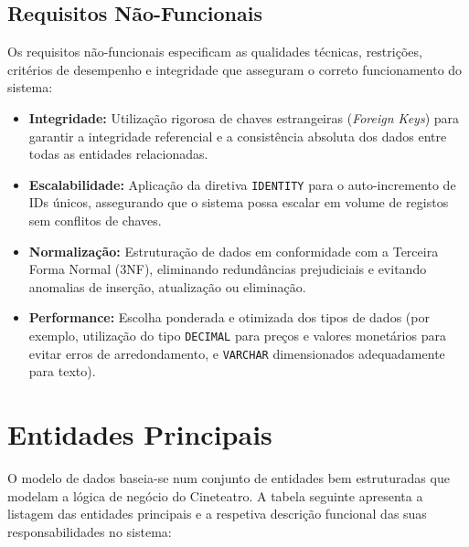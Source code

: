 \documentclass[11pt,a4paper]{article}
\begin{document}
\subsection{Requisitos Não-Funcionais}
Os requisitos não-funcionais especificam as qualidades técnicas, restrições, critérios de desempenho e integridade que asseguram o correto funcionamento do sistema:
\begin{itemize}
    \item \textbf{Integridade:} Utilização rigorosa de chaves estrangeiras (\textit{Foreign Keys}) para garantir a integridade referencial e a consistência absoluta dos dados entre todas as entidades relacionadas.
    \item \textbf{Escalabilidade:} Aplicação da diretiva \texttt{IDENTITY} para o auto-incremento de IDs únicos, assegurando que o sistema possa escalar em volume de registos sem conflitos de chaves.
    \item \textbf{Normalização:} Estruturação de dados em conformidade com a Terceira Forma Normal (3NF), eliminando redundâncias prejudiciais e evitando anomalias de inserção, atualização ou eliminação.
    \item \textbf{Performance:} Escolha ponderada e otimizada dos tipos de dados (por exemplo, utilização do tipo \texttt{DECIMAL} para preços e valores monetários para evitar erros de arredondamento, e \texttt{VARCHAR} dimensionados adequadamente para texto).
\end{itemize}

\section{Entidades Principais}
O modelo de dados baseia-se num conjunto de entidades bem estruturadas que modelam a lógica de negócio do Cineteatro. A tabela seguinte apresenta a listagem das entidades principais e a respetiva descrição funcional das suas responsabilidades no sistema:
\end{document}
